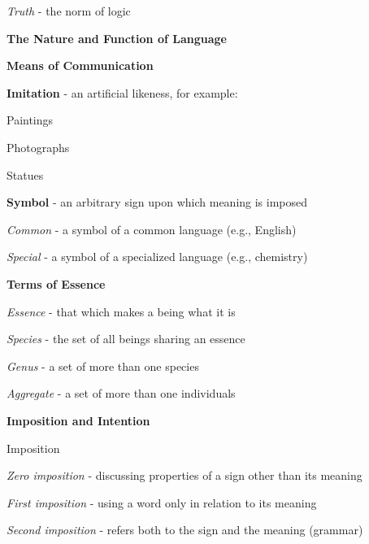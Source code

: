 \documentclass{report}
\begin{document}
\begin{outline}
\begin{outline}
\begin{outline}
       \item \textit{Truth} - the norm of logic
     \end{outline}
  \end{outline}
  \item {\bf The Nature and Function of Language }
  \begin{outline}
    \item {\bf Means of Communication }
    \begin{outline}
      \item {\bf Imitation} - an artificial likeness, for example:
      \begin{outline}
        \item Paintings
        \item Photographs
        \item Statues
      \end{outline}
      \item {\bf Symbol} - an arbitrary sign upon which meaning is imposed
      \begin{outline}
	\item \textit{Common} - a symbol of a common language (e.g., English)
	\item \textit{Special} - a symbol of a specialized language (e.g., chemistry)
      \end{outline}
    \end{outline}
    \item {\bf Terms of Essence }
    \begin{outline}
      \item \textit{Essence} - that which makes a being what it is
      \item \textit{Species} - the set of all beings sharing an essence
      \item \textit{Genus} - a set of more than one species
      \item \textit{Aggregate} - a set of more than one individuals
    \end{outline}
    \item {\bf Imposition and Intention}
    \begin{outline}
      \item Imposition
      \begin{outline}
        \item \textit{Zero imposition} - discussing properties of a sign other than its meaning
        \item \textit{First imposition} - using a word only in relation to its meaning
        \item \textit{Second imposition} - refers both to the sign and the meaning (grammar)

\end{outline}
\end{outline}
\end{outline}
\end{outline}
\end{document}
